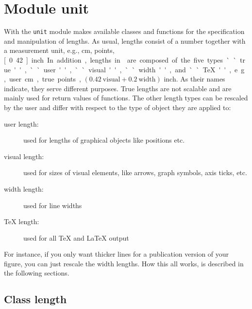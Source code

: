 \chapter{Module unit}
\label{unit}

With the \verb|unit| module \PyX{} makes available classes and
functions for the specification and manipulation of lengths. As usual,
lengths consist of a number together with a measurement unit, e.g.,
\unit[1]{cm}, \unit[50]{points}, \unit[0.42]{inch}.  In addition,
lengths in \PyX{} are composed of the five types ``true'', ``user'',
``visual'', ``width'', and ``\TeX'', e.g., \unit[1]{user cm},
\unit[50]{true points}, $(0.42\ \mathrm{visual} + 0.2\ 
\mathrm{width})$ inch.  As their names indicate, they serve different
purposes. True lengths are not scalable and are mainly used for return
values of \PyX{} functions.  The other length types can be rescaled by
the user and differ with respect to the type of object they are
applied to:

\begin{description}
\item[user length:] used for lengths of graphical objects like
  positions etc.
\item[visual length:] used for sizes of visual elements, like arrows,
  graph symbols, axis ticks, etc.
\item[width length:] used for line widths
\item[\TeX{} length:] used for all \TeX{} and \LaTeX{} output
\end{description}

For instance, if you only want thicker lines for a publication
version of your figure, you can just rescale the width lengths. How
this all works, is described in the following sections.

\section{Class length}

